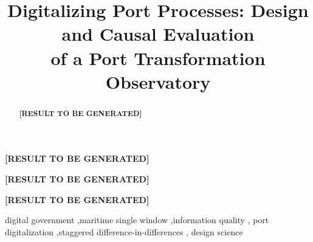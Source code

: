 \documentclass[review,authoryear,12pt]{elsarticle}
\newcommand{\TBG}{\textbf{[RESULT TO BE GENERATED]}}
\begin{document}
\begin{frontmatter}

\title{Digitalizing Port Processes: Design and Causal Evaluation\\
of a Port Transformation Observatory}


\begin{abstract}
\TBG
\end{abstract}

\begin{highlights}
\item \TBG
\item \TBG
\item \TBG
\end{highlights}

\begin{keyword}
digital government \sep maritime single window \sep information quality \sep
port digitalization \sep staggered difference-in-differences \sep
design science
\end{keyword}

\end{frontmatter}



















\clearpage
\nocite{*}


\clearpage
\appendix



\end{document}
